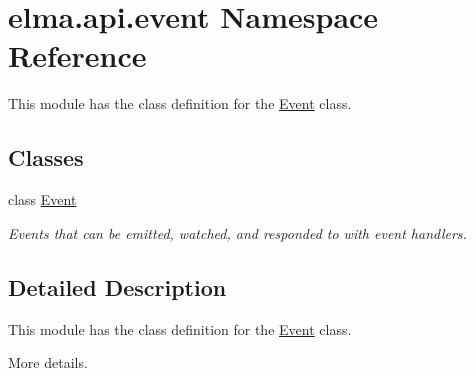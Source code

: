\hypertarget{namespaceelma_1_1api_1_1event}{}\section{elma.\+api.\+event Namespace Reference}
\label{namespaceelma_1_1api_1_1event}


This module has the class definition for the \hyperlink{classelma_1_1api_1_1event_1_1Event}{Event} class.  


\subsection*{Classes}
\begin{DoxyCompactItemize}
\item 
class \hyperlink{classelma_1_1api_1_1event_1_1Event}{Event}
\begin{DoxyCompactList}\small\item\em Events that can be emitted, watched, and responded to with event handlers. \end{DoxyCompactList}\end{DoxyCompactItemize}


\subsection{Detailed Description}
This module has the class definition for the \hyperlink{classelma_1_1api_1_1event_1_1Event}{Event} class. 

More details. 